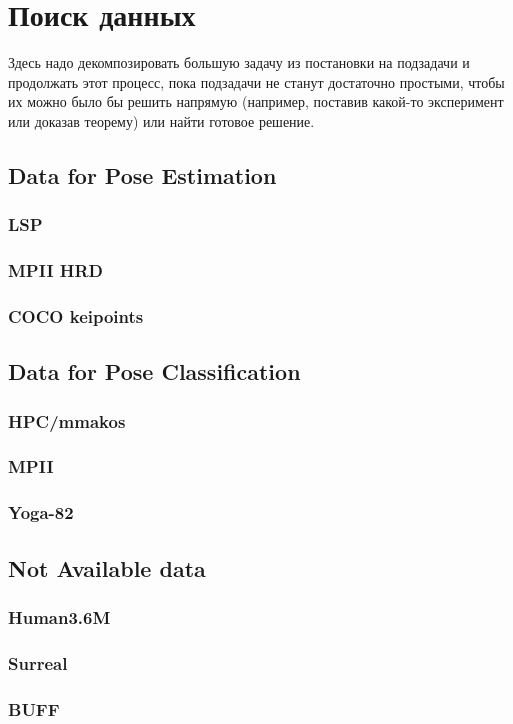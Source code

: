 \section{Поиск данных}
\label{sec:Chapter3} 
Здесь надо декомпозировать большую задачу из постановки на подзадачи и продолжать этот процесс, пока подзадачи не станут достаточно простыми, чтобы их можно было бы решить напрямую (например, поставив какой-то эксперимент или доказав теорему) или найти готовое решение.

\subsection{Data for Pose Estimation}

\subsubsection{LSP}

\subsubsection{MPII HRD}

\subsubsection{COCO keipoints}

\subsection{Data for Pose Classification}

\subsubsection{HPC/mmakos}

\subsubsection{MPII}

\subsubsection{Yoga-82}

\subsection{Not Available data}

\subsubsection{Human3.6M}

\subsubsection{Surreal}

\subsubsection{BUFF}

\newpage